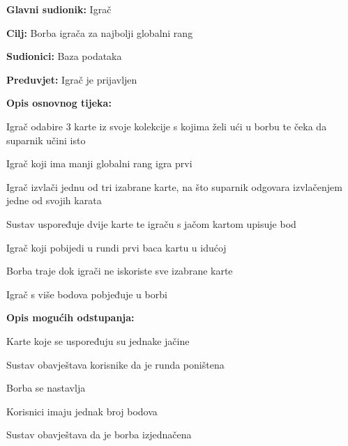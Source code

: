 					\noindent {}
					\begin{packed_item}
						
						\item \textbf{Glavni sudionik: }Igrač
						\item  \textbf{Cilj:} Borba igrača za najbolji globalni rang
						\item  \textbf{Sudionici:} Baza podataka
						\item  \textbf{Preduvjet:} Igrač je prijavljen
						\item  \textbf{Opis osnovnog tijeka:}
						
						\item[] \begin{packed_enum}
							
							\item Igrač odabire 3 karte iz svoje kolekcije s kojima želi ući u borbu te čeka da suparnik učini isto 
							\item Igrač koji ima manji globalni rang igra prvi 
							\item Igrač izvlači jednu od tri izabrane karte, na što suparnik odgovara izvlačenjem jedne od svojih karata
							\item Sustav uspoređuje dvije karte te igraču s jačom kartom upisuje bod
							\item Igrač koji pobijedi u rundi prvi baca kartu u idućoj
							\item Borba traje dok igrači ne iskoriste sve izabrane karte
							\item Igrač s više bodova pobjeđuje u borbi
							
						\end{packed_enum}
					
					\item  \textbf{Opis mogućih odstupanja:}
					
					\item[] \begin{packed_item}
						
						\item Karte koje se uspoređuju su jednake jačine
						\item[] \begin{packed_enum}
							
							\item Sustav obavještava korisnike da je runda poništena
							\item Borba se nastavlja
							
						\end{packed_enum}
					
						\item Korisnici imaju jednak broj bodova
						\item[] \begin{packed_enum}
							
							\item Sustav obavještava da je borba izjednačena
							
						\end{packed_enum}
					\end{packed_item}
					\end{packed_item}
				
